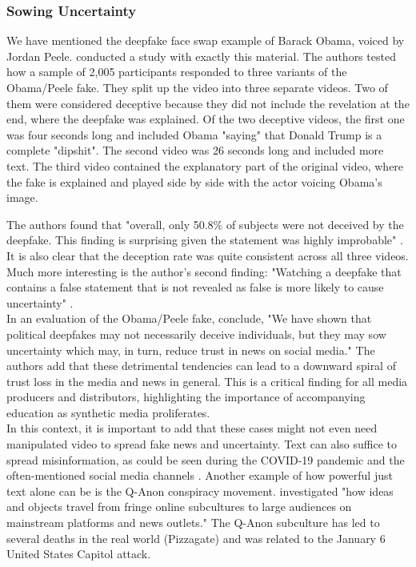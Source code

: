 \documentclass[
  a4paper,  %
  twoside,  %
  bibliography=totoc,
  headsepline,
  cleardoublepage=empty,
  parskip=half,
  draft=false
]{scrbook}
\begin{document}
\subsubsection*{Sowing Uncertainty}
We have mentioned the deepfake face swap example of Barack Obama, voiced by Jordan Peele. \citeauthor{vaccariDeepfakesDisinformationExploring2020} conducted a study with exactly this material. The authors tested how a sample of 2,005 participants responded to three variants of the Obama/Peele fake. They split up the video into three separate videos. Two of them were considered deceptive because they did not include the revelation at the end, where the deepfake was explained. Of the two deceptive videos, the first one was four seconds long and included Obama "saying" that Donald Trump is a complete "dipshit". The second video was 26 seconds long and included more text. The third video contained the explanatory part of the original video, where the fake is explained and played side by side with the actor voicing Obama's image. 

The authors found that "overall, only 50.8\% of subjects were not deceived by the deepfake. This finding is surprising given the statement was highly improbable" \cite{vaccariDeepfakesDisinformationExploring2020}. 
It is also clear that the deception rate was quite consistent across all three videos. Much more interesting is the author's second finding: "Watching a deepfake that contains a false statement that is not revealed as false is more likely to cause uncertainty" \cite{vaccariDeepfakesDisinformationExploring2020}. \\
In an evaluation of the Obama/Peele fake, \citet{vaccariDeepfakesDisinformationExploring2020} conclude, "We have shown that political deepfakes may not necessarily deceive individuals, but they may sow uncertainty which may, in turn, reduce trust in news on social media." The authors add that these detrimental tendencies can lead to a downward spiral of trust loss in the media and news in general. This is a critical finding for all media producers and distributors, highlighting the importance of accompanying education as synthetic media proliferates. \\
In this context, it is important to add that these cases might not even need manipulated video to spread fake news and uncertainty. Text can also suffice to spread misinformation, as could be seen during the COVID-19 pandemic and the often-mentioned social media channels \cite{naeemExplorationHowFake2021}. Another example of how powerful just text alone can be is the Q-Anon conspiracy movement. \citet{zeeuwTracingNormieficationCrossplatform2020} investigated "how ideas and objects travel from fringe online subcultures to large audiences on mainstream platforms and news outlets." The Q-Anon subculture has led to several deaths in the real world (Pizzagate) and was related to the January 6 United States Capitol attack.
\end{document}
